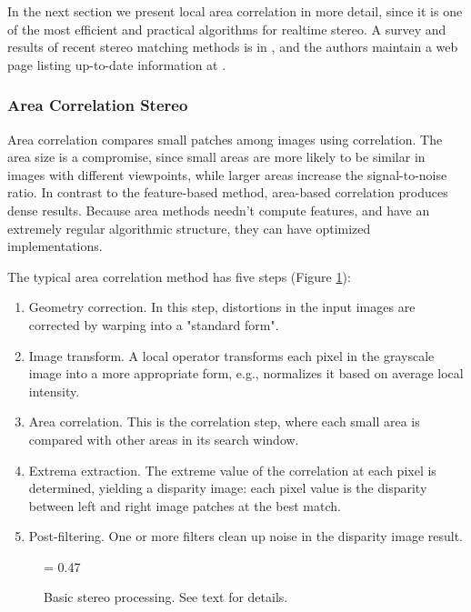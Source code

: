 \documentclass[twocolumn,oneside]{book}
\begin{document}
In the next section we present local area correlation in more detail,
since it is one of the most efficient and practical algorithms for
realtime stereo.  A survey and results of recent stereo matching
methods is in \cite{scharstein02taxonomy}, and the authors maintain a
web page listing up-to-date information at \cite{middlebury}.


\subsubsection{Area Correlation Stereo} 

Area correlation compares small patches among images using
correlation.  The area size is a compromise, since small areas are
more likely to be similar in images with different viewpoints, while
larger areas increase the signal-to-noise ratio.  In contrast to the
feature-based method, area-based correlation produces dense results.
Because area methods needn't compute features, and have an extremely
regular algorithmic structure, they can have optimized
implementations.  

The typical area correlation method has five steps (Figure
\ref{fig23.stereo-processing}): 
\begin{enumerate}
\item Geometry correction.  In this step, distortions in the input
images are corrected by warping into a "standard form". 
\item Image transform.  A local operator transforms each pixel in the
grayscale image into a more appropriate form, e.g., normalizes it
based on average local intensity. 
\item Area correlation.  This is the correlation step, where each
small area is compared with other areas in its search window. 
\item Extrema extraction.  The extreme value of the correlation at
each pixel is determined, yielding a disparity image: each pixel value
is the disparity between left and right image patches at the best
match. 
\item Post-filtering.  One or more filters clean up noise in the
disparity image result. 
\end{enumerate}

\begin{figure}
{\epsfxsize = 0.47\textwidth {}}
\caption{
Basic stereo processing.  See text for details.
\label{fig23.stereo-processing}}

\end{figure}
\end{document}
